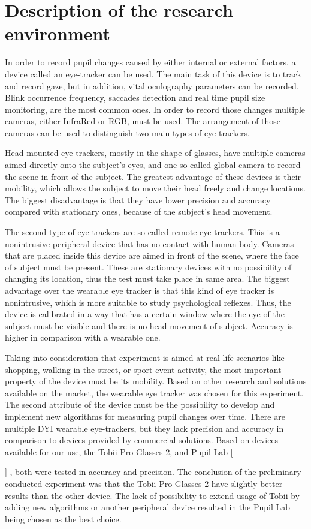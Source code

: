 \documentclass[USenglish,twocolumn]{article}
\newcommand{\Ref}[2]{%
    \IfEqCase{#1}{%
	    {fig}{Figure~\ref{#2}}%
	    {tab}{Table~\ref{#2}}%
	    {equ}{Equation~\ref{#2}}%
    }[\PackageError{tree}{Undefined option to tree: #1}{}]%
}%
\begin{document}
\section{Description of the research environment}
In order to record pupil changes caused by either internal or external factors, a device called an eye-tracker can be used. The main task of this device is to track and record gaze, but in addition, vital oculography parameters can be recorded. Blink occurrence frequency, saccades detection and real time pupil size monitoring, are the most common ones. In order to record those changes multiple cameras, either InfraRed or RGB, must be used. The arrangement of those cameras can be used to distinguish two main types of eye trackers. 

Head-mounted eye trackers, mostly in the shape of glasses, have multiple cameras aimed directly onto the subject’s eyes, and one so-called global camera to record the scene in front of the subject.  The greatest advantage of these devices is their mobility, which allows the subject to move their head freely and change locations. The biggest disadvantage is that they have lower precision and accuracy compared with stationary ones, because of the subject’s head movement.

The second type of eye-trackers are so-called remote-eye trackers. This is a nonintrusive peripheral device that has no contact with human body. Cameras that are placed inside this device are aimed in front of the scene, where the face of subject must be present. These are stationary devices with no possibility of changing its location, thus the test must take place in same area. The biggest advantage over the wearable eye tracker is that this kind of eye tracker is nonintrusive, which is more suitable to study psychological reflexes. Thus, the device is calibrated in a way that has a certain window where the eye of the subject must be visible and there is no head movement of subject. Accuracy is higher in comparison with a wearable one.

Taking into consideration that experiment is aimed at real life scenarios like shopping, walking in the street, or sport event activity, the most important property of the device must be its mobility. Based on other research and solutions available on the market, the wearable eye tracker was chosen for this experiment. The second attribute of the device must be the possibility to develop and implement new algorithms for measuring pupil changes over time. There are multiple DYI wearable eye-trackers, but they lack precision and accuracy in comparison to devices provided by commercial solutions. Based on devices available for our use, the Tobii Pro Glasses 2, and Pupil Lab \Ref{fig}{fig:pupilLab_e}, both were tested in accuracy and precision. The conclusion of the preliminary conducted experiment was that the Tobii Pro Glasses 2 have slightly better results than the other device. The lack of possibility to extend usage of Tobii by adding new algorithms or another peripheral device resulted in the Pupil Lab being chosen as the best choice.
\end{document}
